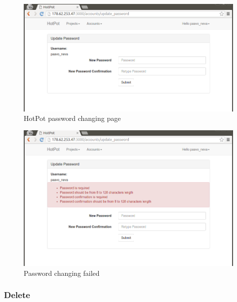 \begin{figure}[bth]                                                                                                                                                  \myfloatalign
\includegraphics[width=1.0\linewidth]{gfx/chapter_5/account/change_password}
\caption[HotPot password changing page]{HotPot password changing page}
\label{fig:user_guide:account:change_password}
\end{figure}

\begin{figure}[bth]                                                                                                                                                  \myfloatalign
\includegraphics[width=1.0\linewidth]{gfx/chapter_5/account/change_password_failed}
\caption[Password changing failed]{Password changing failed}
\label{fig:user_guide:account:change_password_failed}
\end{figure}

\clearpage

\subsubsection{Delete}
\label{ch:result:user_guide:account:delete}

